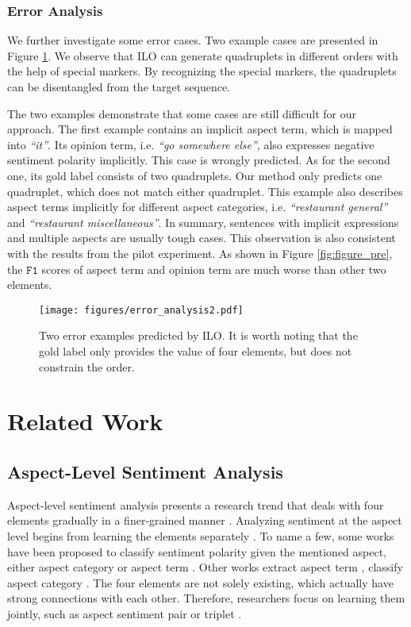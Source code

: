 \documentclass[11pt]{article}
\begin{document}
\subsubsection{Error Analysis}
We further investigate some error cases. Two example cases are presented in Figure \ref{fig:figure_error}. We observe that ILO can generate quadruplets in different orders with the help of special markers. By recognizing the special markers, the quadruplets can be disentangled from the target sequence.

The two examples demonstrate that some cases are still difficult for our approach. The first example contains an implicit aspect term, which is mapped into \emph{``it''}. Its opinion term, i.e. \emph{``go somewhere else''}, also expresses negative sentiment polarity implicitly. This case is wrongly predicted. As for the second one, its gold label consists of two quadruplets. Our method only predicts one quadruplet, which does not match either quadruplet. This example also describes aspect terms implicitly for different aspect categories, i.e. \emph{``restaurant general''} and \emph{``restaurant miscellaneous''}. In summary, sentences with implicit expressions and multiple aspects are usually tough cases. This observation is also consistent with the results from the pilot experiment. As shown in Figure \ref{fig:figure_pre}, the $\mathtt{F1}$ scores of aspect term and opinion term are much worse than other two elements.





\begin{figure}[t]
\centering
\texttt{[image: figures/error\_analysis2.pdf]} 
\caption{Two error examples predicted by ILO. It is worth noting that the gold label only provides the value of four elements, but does not constrain the order.}
\label{fig:figure_error}
\end{figure}


\section{Related Work}
\subsection{Aspect-Level Sentiment Analysis}
Aspect-level sentiment analysis presents a research trend that deals with four elements gradually in a finer-grained manner \cite{zhang2022survey}. Analyzing sentiment at the aspect level begins from learning the elements separately \cite{pontiki-etal-2014-semeval}. To name a few, some works have been proposed to classify sentiment polarity given the mentioned aspect, either aspect category \cite{hu-etal-2019-constrained} or aspect term \cite{zhang2020convolution}. Other works extract aspect term \cite{ma-etal-2019-exploring}, classify aspect category \cite{bu-etal-2021-asap}. The four elements are not solely existing, which actually have strong connections with each other. Therefore, researchers focus on learning them jointly, such as aspect sentiment pair \cite{zhao-etal-2020-spanmlt,cai2020aspect} or triplet \cite{chen-qian-2020-relation,mao2021joint}. 
\end{document}
